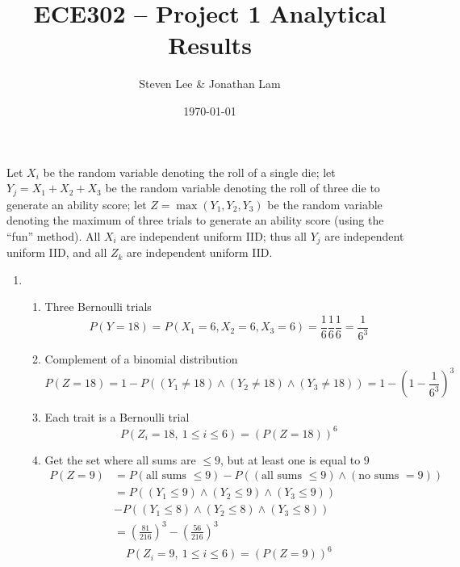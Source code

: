 \documentclass{article}
\title{ECE302 -- Project 1 Analytical Results}
\author{Steven Lee \& Jonathan Lam}
\date{\today}
\begin{document}
	\maketitle
	
	\noindent Let $X_i$ be the random variable denoting the roll of a single die; let $Y_j=X_1+X_2+X_3$ be the random variable denoting the roll of three die to generate an ability score; let $Z=\max(Y_1,Y_2,Y_3)$ be the random variable denoting the maximum of three trials to generate an ability score (using the ``fun'' method). All $X_i$ are independent uniform IID; thus all $Y_j$ are independent uniform IID, and all $Z_k$ are independent uniform IID.
	
	\begin{enumerate}
		\item 
		\begin{enumerate}
			\item Three Bernoulli trials
			\begin{equation*}
				P(Y=18)=P(X_1=6,X_2=6,X_3=6)=\frac{1}{6}\frac{1}{6}\frac{1}{6}=\frac{1}{6^3}
			\end{equation*}
			
			\item Complement of a binomial distribution
			\begin{equation*}
				P(Z=18)=1-P((Y_1\ne 18)\land (Y_2\ne 18)\land (Y_3\ne 18))=1-\left(1-\frac{1}{6^3}\right)^3
			\end{equation*}
			
			\item Each trait is a Bernoulli trial
			\begin{equation*}
				P(Z_i=18,\ 1\le i\le 6)=(P(Z=18))^6
			\end{equation*}
			
			\item Get the set where all sums are $\le 9$, but at least one is equal to $9$
			\begin{align*}
				P(Z=9)&=P(\text{all sums }\le 9)-P((\text{all sums }\le9)\land(\text{no sums }=9))\\
				&=P((Y_1\le 9)\land (Y_2\le 9)\land(Y_3\le 9))\\
				&-P((Y_1\le 8)\land (Y_2\le 8)\land(Y_3\le 8))\\
				&=\left(\frac{81}{216}\right)^3-\left(\frac{56}{216}\right)^3
			\end{align*}
			\begin{gather*}
				P(Z_i=9,\ 1\le i\le 6)=(P(Z=9))^6
			\end{gather*}
		\end{enumerate}
	

\end{enumerate}
\end{document}
